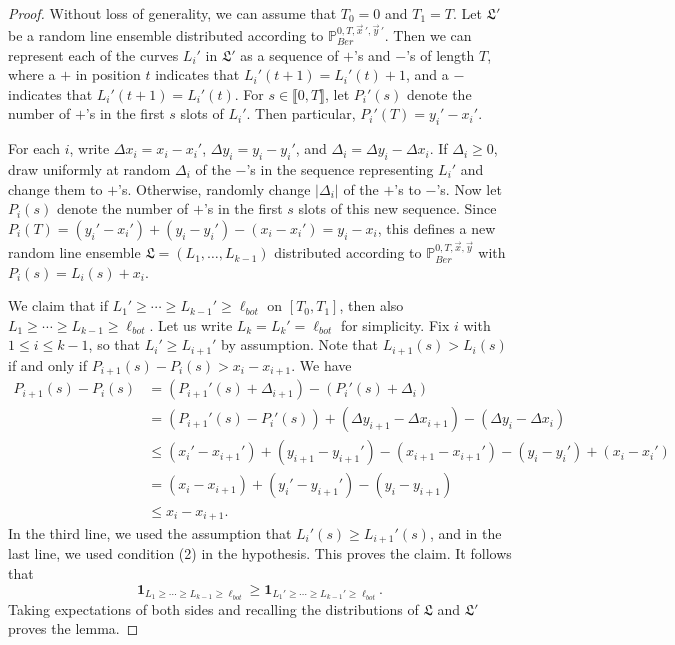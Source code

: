 	\begin{proof}
		Without loss of generality, we can assume that $T_0 = 0$ and $T_1 = T$. Let $\mathfrak{L}'$ be a random line ensemble distributed according to $\mathbb{P}^{0, T, \vec{x}\,', \vec{y}\,'}_{Ber}$. Then we can represent each of the curves $L_i'$ in $\mathfrak{L}'$ as a sequence of $+$'s and $-$'s of length $T$, where a $+$ in position $t$ indicates that $L_i'(t+1) = L_i'(t) + 1$, and a $-$ indicates that $L_i'(t+1) = L_i'(t)$. For $s\in\llbracket 0, T\rrbracket$, let $P_i'(s)$ denote the number of $+$'s in the first $s$ slots of $L_i'$. Then particular, $P_i'(T) = y_i' - x_i'$.
		
		For each $i$, write $\Delta x_i = x_i - x_i'$, $\Delta y_i = y_i - y_i'$, and $\Delta_i = \Delta y_i - \Delta x_i$. If $\Delta_i \geq 0$, draw uniformly at random $\Delta_i$ of the $-$'s in the sequence representing $L_i'$ and change them to $+$'s. Otherwise, randomly change $\lvert{\Delta_i}\rvert$ of the $+$'s to $-$'s. Now let $P_i(s)$ denote the number of $+$'s in the first $s$ slots of this new sequence. Since $P_i(T) = (y_i' - x_i') + (y_i - y_i') - (x_i - x_i') = y_i - x_i$, this defines a new random line ensemble $\mathfrak{L} = (L_1,\dots,L_{k-1})$ distributed according to $\mathbb{P}^{0,T,\vec{x},\vec{y}}_{Ber}$ with $P_i(s)=L_i(s)+x_i$.
		
		We claim that if $L_1' \geq \cdots \geq L_{k-1}' \geq \ell_{bot}$ on $[T_0, T_1]$, then also $L_1 \geq \cdots \geq L_{k-1} \geq \ell_{bot}$. Let us write $L_k = L_k' = \ell_{bot}$ for simplicity. Fix $i$ with $1\leq i\leq k - 1$, so that $L_i' \geq L_{i+1}'$ by assumption. Note that $L_{i+1}(s) > L_i(s)$ if and only if $P_{i+1}(s) - P_i(s) > x_i - x_{i+1}$. We have
		\begin{align*}
		P_{i+1}(s) - P_i(s) &= (P_{i+1}'(s) + \Delta_{i+1}) - (P_i'(s) + \Delta_i)\\
		&= (P_{i+1}'(s) - P_i'(s)) + (\Delta y_{i+1} - \Delta x_{i+1}) - (\Delta y_i - \Delta x_i)\\
		&\leq (x_i' - x_{i+1}') + (y_{i+1} - y_{i+1}') - (x_{i+1} - x_{i+1}') - (y_i - y_i') + (x_i - x_i')\\
		&= (x_i - x_{i+1}) + (y_i' - y_{i+1}') - (y_i - y_{i+1})\\
		&\leq x_i - x_{i+1}.
		\end{align*}
		In the third line, we used the assumption that $L_i'(s) \geq L_{i+1}'(s)$, and in the last line, we used condition (2) in the hypothesis. This proves the claim. It follows that
		\[
		\mathbf{1}_{L_1 \geq \cdots \geq L_{k-1} \geq \ell_{bot}} \geq \mathbf{1}_{L_1' \geq \cdots \geq L_{k-1}' \geq \ell_{bot}}.
		\]
		Taking expectations of both sides and recalling the distributions of $\mathfrak{L}$ and $\mathfrak{L}'$ proves the lemma.
		
		\end{proof}
		
